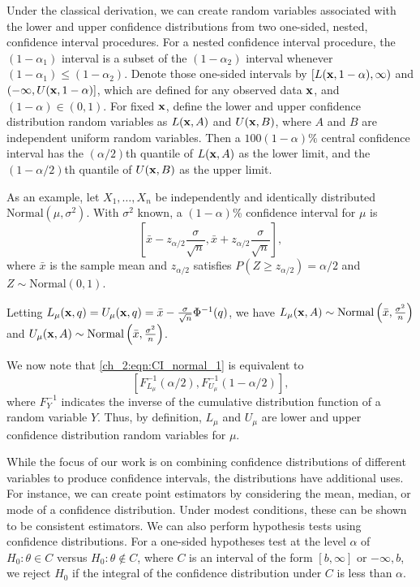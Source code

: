 Under the classical derivation, we can create random variables associated with the lower and upper confidence distributions from two one-sided, nested, confidence interval procedures.
For a nested confidence interval procedure, the $(1-\alpha_1)$ interval is a subset of the $(1-\alpha_2)$ interval whenever $(1-\alpha_1) \leq (1-\alpha_2)$.
Denote those one-sided intervals by $[L({\bf x},1-\alpha), \infty)$ and $(-\infty, U({\bf x},1-\alpha)]$, which are defined for any observed data ${\bf x}$, and $(1-\alpha) \in (0,1)$.
For fixed ${\bf x}$, define the lower and upper confidence distribution random variables as $L({\bf x}, A)$ and $U({\bf x},B)$, where $A$ and $B$ are independent uniform random variables.
Then a $100(1-\alpha)\%$ central confidence interval has the $(\alpha/2)$th quantile of $L({\bf x}, A)$ as the lower limit, and the $(1-\alpha/2)$th quantile of $U({\bf x},B)$ as the upper limit.

As an example, let \( X_1, \ldots, X_n \) be independently and identically distributed \( \textrm{Normal}(\mu, \sigma^2) \).
With \( \sigma^2 \) known, a \( (1 - \alpha) \)\% confidence interval for \( \mu \) is
\begin{equation}
\left[ \bar{x} - z_{\alpha/2} \frac{\sigma}{\sqrt{n}}, \bar{x} + z_{\alpha/2} \frac{\sigma}{\sqrt{n}} \right],
\label{ch_2:eqn:CI_normal_1}
\end{equation}
where \( \bar{x} \) is the sample mean and \( z_{\alpha / 2} \) satisfies \( P(Z \geq z_{\alpha / 2}) = \alpha / 2 \) and \( Z \sim \textrm{Normal}(0,1) \).

Letting \( L_\mu (\mathbf{x}, q) = U_\mu (\mathbf{x}, q) = \bar{x} - \frac{\sigma}{\sqrt{n}} \Phi^{-1}(q) \), we have \( L_\mu(\mathbf{x}, A) \sim \textrm{Normal} \left( \bar{x}, \frac{\sigma^2}{n} \right) \) and \( U_\mu(\mathbf{x}, A) \sim \textrm{Normal} \left( \bar{x}, \frac{\sigma^2}{n} \right) \).

We now note that \eqref{ch_2:eqn:CI_normal_1} is equivalent to
\begin{equation}
    \left[ F_{L_{\mu}}^{-1}(\alpha / 2), F_{U_{\mu}}^{-1}(1- \alpha / 2) \right],
\end{equation}
where \( F_Y^{-1} \) indicates the inverse of the cumulative distribution function of a random variable \( Y \).
Thus, by definition, \( L_\mu \) and \( U_\mu \) are lower and upper confidence distribution random variables for \( \mu \).

While the focus of our work is on combining confidence distributions of different variables to produce confidence intervals, the distributions have additional uses.
For instance, we can create point estimators by considering the mean, median, or mode of a confidence distribution.
Under modest conditions, these can be shown to be consistent estimators.
We can also perform hypothesis tests using confidence distributions.
For a one-sided hypotheses test at the level \( \alpha \) of \( H_0: \theta \in C \) versus \( H_0: \theta \notin C \), where \( C \) is an interval of the form \( [b, \infty] \) or \( -\infty, b \), we reject \( H_0 \) if the integral of the confidence distribution under \( C \) is less than \( \alpha \).

